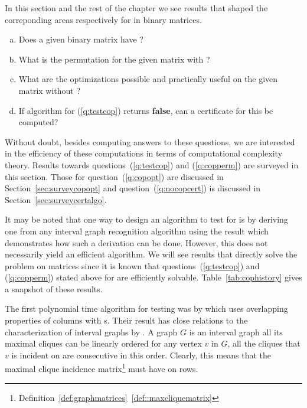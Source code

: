In this section and the rest of the chapter we see results that shaped the
correponding areas respectively for \cop in binary matrices.

\begin{enumerate}[a.]
\singlespacing
\item \label{q:testcop} Does a given binary matrix have \COP?
\item \label{q:copperm} What is the \COP permutation for the given matrix with \COP?
\item \label{q:copopt} What are the optimizations possible and practically useful on
  the given matrix without \COP?
\item \label{q:nocopcert} If algorithm for (\ref{q:testcop}) returns
  \textbf{false}, can a certificate for this be computed?
\end{enumerate}

Without doubt, besides computing answers to these questions, we are
interested in the efficiency of these computations in terms of
computational complexity theory. Results towards
questions~(\ref{q:testcop}) and (\ref{q:copperm}) are surveyed in this
section. Those for question~(\ref{q:copopt}) are discussed in
Section~\ref{sec:surveycopopt} and question~(\ref{q:nocopcert}) is discussed
in Section~\ref{sec:surveycertalgo}.

It may be noted that one way to design an algorithm to test for \COP
is by deriving one from any interval graph recognition algorithm using
the result \cite{hmpv00} \cite[Th~2.7]{d08phd} which demonstrates how
such a derivation can be done. However, this does not necessarily
yield an efficient algorithm. We will see results that directly solve
the problem on matrices since it is known that
questions~(\ref{q:testcop}) and (\ref{q:copperm}) stated above for
\COP are efficiently solvable.  Table~\ref{tab:cophistory} gives a
snapshot of these results.

\tabcophistory

The first polynomial time algorithm for \COP testing was by
\cite{fg65} which uses overlapping properties of columns with \un
s. Their result has close relations to the characterization of
interval graphs by \cite{gh64}. A graph $G$ is an interval graph \iff
all its maximal cliques can be linearly ordered \stt for any vertex
$v$ in $G$, all the cliques that $v$ is incident on are consecutive in
this order. Clearly, this means that the maximal clique incidence
matrix\footnote{
  Definition~\ref{def:graphmatrices}~\ref{def::maxcliquematrix}} must
have \COP on rows.

